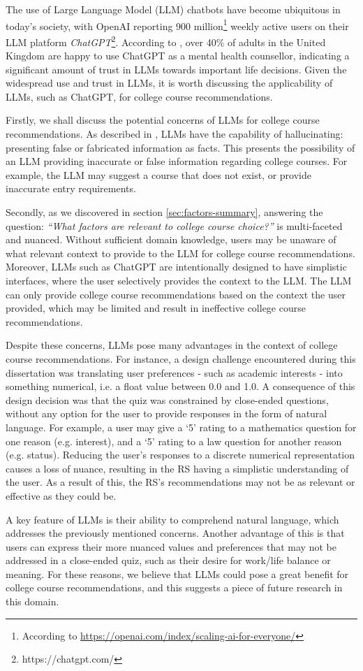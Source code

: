 The use of Large Language Model (LLM) chatbots have become ubiquitous in today's society,
with OpenAI reporting 900 million\footnote{According to \url{https://openai.com/index/scaling-ai-for-everyone/}} 
weekly active users on their LLM platform \emph{ChatGPT}\footnote{https://chatgpt.com/}.
According to \cite{yankouskaya2026lets}, over 40\% of adults in the United Kingdom are happy to use ChatGPT as a mental health counsellor,
indicating a significant amount of trust in LLMs towards important life decisions.
Given the widespread use and trust in LLMs,
it is worth discussing the applicability of LLMs, such as ChatGPT, for college course recommendations.

Firstly, we shall discuss the potential concerns of LLMs for college course recommendations.
As described in \cite{alansari2025large}, LLMs have the capability of hallucinating:
presenting false or fabricated information as facts.
This presents the possibility of an LLM providing inaccurate or 
false information regarding college courses.
For example, the LLM may suggest a course that does not exist, or 
provide inaccurate entry requirements.

Secondly, as we discovered in section \ref{sec:factors-summary},
answering the question: \emph{``What factors are relevant to college course choice?''}
is multi-faceted and nuanced.
Without sufficient domain knowledge, users may be unaware of what relevant context to provide to the LLM
for college course recommendations.
Moreover, LLMs such as ChatGPT are intentionally designed to have simplistic interfaces, 
where the user selectively provides the context to the LLM.
The LLM can only provide college course recommendations 
based on the context the user provided,
which may be limited and result in ineffective college course recommendations.

Despite these concerns, LLMs pose many advantages in the context of college course recommendations.
For instance, a design challenge encountered during this dissertation was translating user preferences - such as academic interests - 
into something numerical, i.e. a float value between 0.0 and 1.0.
A consequence of this design decision was that the quiz was constrained by close-ended questions,
without any option for the user to provide responses in the form of natural language.
For example, a user may give a `5' rating to a mathematics question for one reason (e.g. interest),
and a `5' rating to a law question for another reason (e.g. status).
Reducing the user's responses to a discrete numerical representation causes a loss of nuance,
resulting in the RS having a simplistic understanding of the user.
As a result of this, the RS's recommendations may not be as relevant or effective 
as they could be.

A key feature of LLMs is their ability to comprehend natural language,
which addresses the previously mentioned concerns.
Another advantage of this is that users can express their more nuanced values and preferences
that may not be addressed in a close-ended quiz,
such as their desire for work/life balance or meaning.
For these reasons, we believe that LLMs could pose a great benefit for college course recommendations,
and this suggests a piece of future research in this domain.
